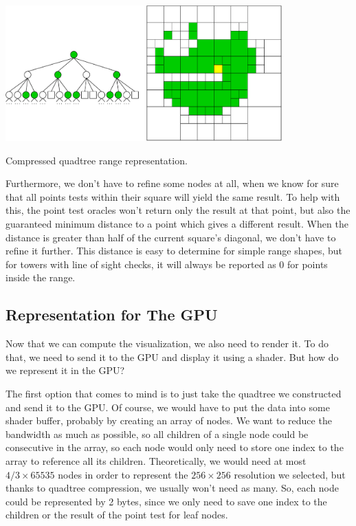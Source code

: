 \begin{center}
    \captionsetup{type=figure}
    \includegraphics[width=0.8\textwidth]{img/quadtree compressed.pdf}
    \caption{Compressed quadtree range representation.}
    \label{fig:quadtree-compressed}
\end{center}

Furthermore, we don't have to refine some nodes at all, when we know for sure that all points tests within their square will yield the same result.
To help with this, the point test oracles won't return only the result at that point, but also the guaranteed minimum distance to a point which gives a different result.
When the distance is greater than half of the current square's diagonal, we don't have to refine it further.
This distance is easy to determine for simple range shapes, but for towers with line of sight checks, it will always be reported as 0 for points inside the range.

\subsection{Representation for The GPU}

Now that we can compute the visualization, we also need to render it.
To do that, we need to send it to the GPU and display it using a shader.
But how do we represent it in the GPU?

The first option that comes to mind is to just take the quadtree we constructed and send it to the GPU.
Of course, we would have to put the data into some shader buffer, probably by creating an array of nodes.
We want to reduce the bandwidth as much as possible, so all children of a single node could be consecutive in the array, so each node would only need to store one index to the array to reference all its children.
Theoretically, we would need at most $4/3 \times 65535$ nodes in order to represent the $256 \times 256$ resolution we selected, but thanks to quadtree compression, we usually won't need as many.
So, each node could be represented by 2 bytes, since we only need to save one index to the children or the result of the point test for leaf nodes.

